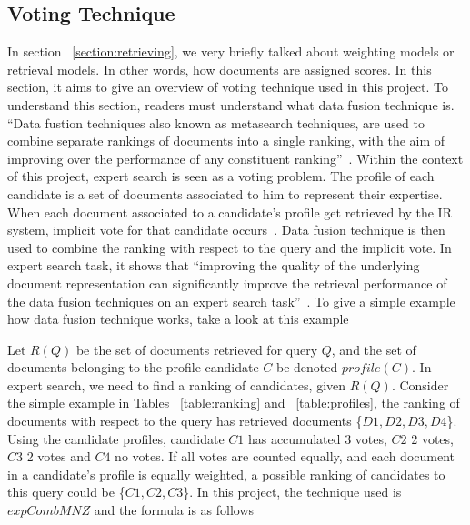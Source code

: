\subsection{Voting Technique}\label{section:voting}
In section ~\ref{section:retrieving}, we very briefly talked about weighting models or retrieval models. In other words, how documents are assigned scores. In this section,
it aims to give an overview of voting technique used in this project. To understand this section, readers must understand what data fusion technique is. 
``Data fustion techniques also known as metasearch techniques, are used to combine separate rankings of documents into a single ranking,
with the aim of improving over the performance of any constituent ranking''~\cite[P. 388]{expertsearch}. Within the context of this project, 
expert search is seen as a voting problem. The profile of each candidate is a set of documents associated to him to represent their expertise.
When each document associated to a candidate's profile get retrieved by the IR system, implicit vote for that candidate occurs~\cite[P. 389]{expertsearch}.
Data fusion technique is then used to combine the ranking with respect to the query and the implicit vote. In expert search task, it shows that 
``improving the quality of the underlying document representation can significantly improve the retrieval performance of the data fusion techniques 
on an expert search task''~\cite[P. 387]{expertsearch}. To give a simple example how data fusion technique works, take a look at this example

Let $R(Q)$ be the set of documents retrieved for query $Q$, and the set of documents belonging to the profile candidate $C$ be denoted $profile(C)$. In expert
search, we need to find a ranking of candidates, given $R(Q)$. Consider the simple example in Tables ~\ref{table:ranking} and ~\ref{table:profiles},
the ranking of documents with respect to the query has retrieved documents \{$D1, D2, D3, D4$\}. Using the candidate profiles, candidate $C1$ has accumulated
3 votes, $C2$ 2 votes, $C3$ 2 votes and $C4$ no votes. If all votes are counted equally, and each document in a candidate's profile is equally weighted, a possible
ranking of candidates to this query could be \{$C1, C2, C3$\}. In this project, the technique used is $expCombMNZ$ and the formula is as follows

